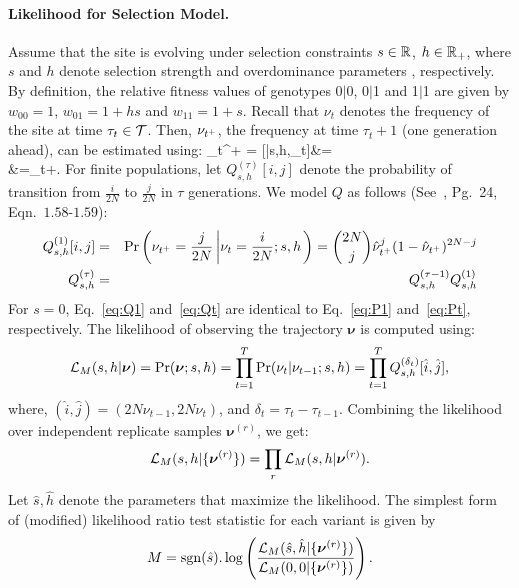 \paragraph{Likelihood for Selection Model.}
Assume that the site is evolving under selection constraints $s\in
{\mathbb R}$, $h\in {\mathbb R}_+$, where $s$ and $h$ denote selection strength and 
overdominance parameters ,
respectively. By definition, the relative fitness values of genotypes
0$|$0, 0$|$1 and 1$|$1 are given by $w_{00}=1$, $w_{01}=1+hs$ and
$w_{11}=1+s$. Recall that $\nu_t$ denotes the frequency of the site at
time $\tau_t\in {\cal T}$. Then, $\nu_{t^+}$, the frequency at time
$\tau_{t}+1$ (one generation ahead), can be estimated using: \beq 
\hat{\nu}_{t^+} =
[\nusp|s,h,\nu_t]&=\\
&=\nu_t+.
  \label{eq:transition}
\eeq
For finite populations, let $Q^{(\tau)}_{s,h}[i,j]$ denote the
probability of transition from $\frac{i}{2N}$ to $\frac{j}{2N}$ in
$\tau$ generations. We model $Q$ as follows
(See~\cite{Ewens2012Mathematical}, Pg.~24, Eqn.~$1.58$-$1.59$):
\begin{eqnarray}
  Q^{(1)}_{s,h}[i,j] &=& \operatorname{Pr}\left(\nu_{t^+}=\frac{j}{2N} \left\lvert
      \nu_{t}=\frac{i}{2N};s,h \right .\right)={2N \choose j}
  \hat{\nu}_{t^+}^{j} (1-\hat{\nu}_{t^+})^{2N-j}\label{eq:Q1}\\
  Q^{(\tau)}_{s,h} &=& Q^{(\tau-1)}_{s,h}Q^{(1)}_{s,h}\label{eq:Qt}
  \label{eq:mkvs}   
\end{eqnarray}
For $s=0$, Eq.~\ref{eq:Q1} and~\ref{eq:Qt} are identical to
Eq.~\ref{eq:P1} and~\ref{eq:Pt}, respectively.  The likelihood of
observing the trajectory $\bm{\nu}$ is computed using:
\begin{equation}
  {\cal L}_M(s,h|\bm{\nu}) = \operatorname{Pr}(\bm{\nu};s,h)=
  \prod_{t=1}^{T} \operatorname{Pr}(\nu_{t}|\nu_{t-1};s,h) = \prod_{t=1}^{T} 
  Q^{(\delta_t)}_{s,h}[\hat{i},\hat{j}],
\end{equation}
where, $(\hat{i},\hat{j})=( 2N\nu_{t-1}, 2N\nu_{t})$, and
$\delta_t=\tau_{t}-\tau_{t-1}$.  Combining the likelihood over
independent replicate samples $\bm{\nu}^{(r)}$, we get:
\begin{equation}
  {\cal L}_M(s,h|\{\bm{\nu}^{(r)}\}) = \prod_r   {\cal L}_M(s,h|\bm{\nu}^{(r)}).
  \label{eq:mkvlik}
\end{equation}
Let $\hat{s},\hat{h}$ denote the parameters that maximize the
likelihood. The simplest form of (modified) likelihood ratio test statistic  
for each variant is given by
\begin{eqnarray}
  M=\operatorname{sgn} (\hat{s}). \log 
  \left(\frac{{\cal L}_M(\hat{s},\hat{h}|\{\bm{\nu}^{(r)}\})}{{\cal L}_M(0,0|\{\bm{\nu}^{(r)}\})}\right).
\label{eq:mcts}
\end{eqnarray}




